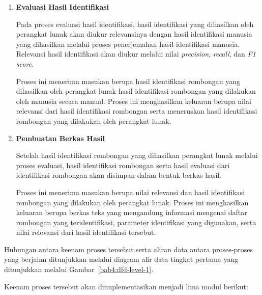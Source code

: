 \begin{enumerate}
    \item \textbf{Evaluasi Hasil Identifikasi}
    
    Pada proses evaluasi hasil identifikasi, hasil identifikasi yang dihasilkan oleh perangkat lunak akan diukur relevansinya dengan hasil identifikasi manusia yang dihasilkan melalui proses penerjemahan hasil identifikasi manusia. Relevansi hasil identifikasi akan diukur melalui nilai \textit{precision}, \textit{recall}, dan \textit{F1 score}.
    
    Proses ini menerima masukan berupa hasil identifikasi rombongan yang dihasilkan oleh perangkat lunak hasil identifikasi rombongan yang dilakukan oleh manusia secara manual. Proses ini menghasilkan keluaran berupa nilai relevansi dari hasil identifikasi rombongan serta meneruskan hasil identifikasi rombongan yang dilakukan oleh perangkat lunak.
    
    \item \textbf{Pembuatan Berkas Hasil}
    
    Setelah hasil identifikasi rombongan yang dihasilkan perangkat lunak melalui proses evaluasi, hasil identifikasi rombongan serta hasil evaluasi dari identifikasi rombongan akan disimpan dalam bentuk berkas hasil.
    
    Proses ini menerima masukan berupa nilai relevansi dan hasil identifikasi rombongan yang dilakukan oleh perangkat lunak. Proses ini menghasilkan keluaran berupa berkas teks yang mengandung informasi mengenai daftar rombongan yang teridentifikasi, parameter identifikasi yang digunakan, serta nilai relevansi dari hasil identifikasi tersebut.
\end{enumerate}

\noindent Hubungan antara keenam proses tersebut serta aliran data antara proses-proses yang berjalan ditunjukkan melalui diagram alir data tingkat pertama yang ditunjukkan melalui Gambar~\ref{bab4:dfd-level-1}.



\noindent Keenam proses tersebut akan diimplementasikan menjadi lima modul berikut:

